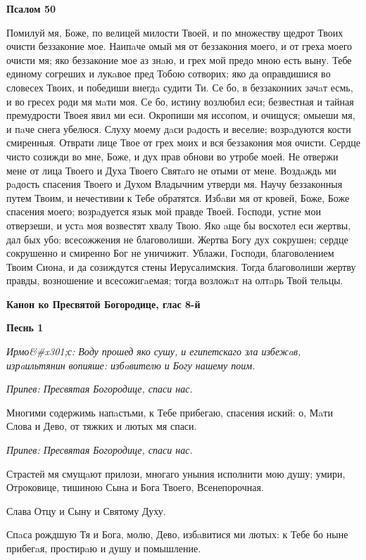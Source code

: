 \bfseries Псалом 50\normalfont{}


Помилуй мя, Боже, по велицей милости Твоей, и по множеству щедрот Твоих очисти беззаконие мое. Наипaче омый мя от беззакония моего, и от греха моего очисти мя; яко беззаконие мое аз знaю, и грех мой предо мною есть выну. Тебе единому согреших и лукaвое пред Тобою сотворих; яко да оправдишися во словесех Твоих, и победиши внегдa судити Ти. Се бо, в беззакониих зачaт есмь, и во гресех роди мя мaти моя. Се бо, истину возлюбил еси; безвестная и тайная премудрости Твоея явил ми еси. Окропиши мя иссопом, и очищуся; омыеши мя, и пaче снега убелюся. Слуху моему дaси рaдость и веселие; возрaдуются кости смиренныя. Отврати лице Твое от грех моих и вся беззакония моя очисти. Сердце чисто созижди во мне, Боже, и дух прав обнови во утробе моей. Не отвержи мене от лица Твоего и Духа Твоего Святaго не отыми от мене. Воздaждь ми рaдость спасения Твоего и Духом Владычним утверди мя. Научу беззаконныя путем Твоим, и нечестивии к Тебе обратятся. Избaви мя от кровей, Боже, Боже спасения моего; возрaдуется язык мой правде Твоей. Господи, устне мои отверзеши, и устa моя возвестят хвалу Твою. Яко aще бы восхотел еси жертвы, дал бых убо: всесожжения не благоволиши. Жертва Богу дух сокрушен; сердце сокрушенно и смиренно Бог не уничижит. Ублажи, Господи, благоволением Твоим Сиона, и да созиждутся стены Иерусалимския. Тогда благоволиши жертву правды, возношение и всесожигaемая; тогда возложaт на олтaрь Твой тельцы.




\bfseries Канон ко Пресвятой Богородице, глас 8-й\normalfont{}




\bfseries Песнь 1\normalfont{}


\itshape Ирмо&#x301;с:\normalfont{} Воду прошед яко сушу, и египетскаго зла избежaв, изрaильтянин вопияше: избaвителю и Богу нашему поим.


\itshape Припев:\normalfont{} Пресвятая Богородице, спаси нас.


Многими содержимь напaстьми, к Тебе прибегаю, спасения иский: о, Мaти Слова и Дево, от тяжких и лютых мя спаси.


\itshape Припев:\normalfont{} Пресвятая Богородице, спаси нас.


Страстей мя смущaют прилози, многаго уныния исполнити мою душу; умири, Отроковице, тишиною Сына и Бога Твоего, Всенепорочная.


Слава Отцу и Сыну и Святому Духу.


Спaса рождшую Тя и Бога, молю, Дево, избaвитися ми лютых: к Тебе бо ныне прибегaя, простирaю и душу и помышление.



